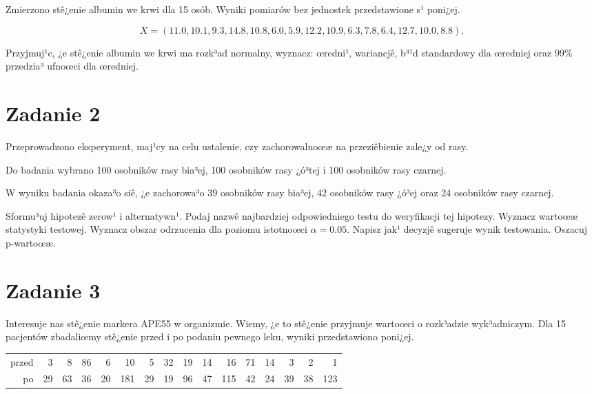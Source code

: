 \documentclass[a4paper,12pt]{article}
\begin{document}
     Zmierzono stê¿enie albumin we krwi dla 15 osób. 
     Wyniki pomiarów bez jednostek przedstawione s¹ poni¿ej. 
     
     \noindent $$X=( 11.0, 10.1,  9.3, 14.8, 10.8,  6.0,  5.9, 12.2, 10.9,  6.3,  7.8,  6.4, 12.7, 10.0,  8.8 ).$$
     
     Przyjmuj¹c, ¿e stê¿enie albumin we krwi ma rozk³ad normalny, 
     wyznacz: œredni¹, wariancjê, b³¹d standardowy dla œredniej oraz 99\% przedzia³ ufnoœci dla œredniej. \vspace{1cm} 

  \section*{Zadanie 2}
     
  Przeprowadzono eksperyment, maj¹cy na celu ustalenie, czy zachorowalnoœæ na przeziêbienie zale¿y od rasy.
  
  Do badania wybrano 100 osobników rasy bia³ej, 100 osobników rasy ¿ó³tej i 100 osobników rasy czarnej. 
  
  W wyniku badania okaza³o siê, ¿e zachorowa³o 39 osobników rasy bia³ej, 42 osobników rasy ¿ó³ej oraz 24 osobników rasy czarnej. 
  
  Sformu³uj hipotezê zerow¹ i alternatywn¹. 
  Podaj nazwê najbardziej odpowiedniego testu do weryfikacji tej hipotezy. 
  Wyznacz wartoœæ statystyki testowej. 
  Wyznacz obszar odrzucenia dla poziomu istotnoœci $\alpha=0.05$. 
  Napisz jak¹ decyzjê sugeruje wynik testowania. Oszacuj p-wartoœæ. \vspace{1cm} 

  \section*{Zadanie 3}
     
  Interesuje nas stê¿enie markera APE55  w organizmie. 
  Wiemy, ¿e to stê¿enie przyjmuje wartoœci o rozk³adzie wyk³adniczym. 
  Dla 15 pacjentów zbadaliœmy stê¿enie przed i po podaniu pewnego leku, 
  wyniki przedstawiono poni¿ej.
  
  \vspace{0.5cm} 
  \noindent\begin{center} 
\begin{tabular}{rrrrrrrrrrrrrrrr}
  \hline
  \hline
przed & 3 & 8 & 86 & 6 & 10 & 5 & 32 & 19 & 14 & 16 & 71 & 14 & 3 & 2 & 1 \\
  po & 29 & 63 & 36 & 20 & 181 & 29 & 19 & 96 & 47 & 115 & 42 & 24 & 39 & 38 & 123 \\
   \hline
\end{tabular}
 
  \end{center} 
  \vspace{0.5cm}
  
\end{document}
